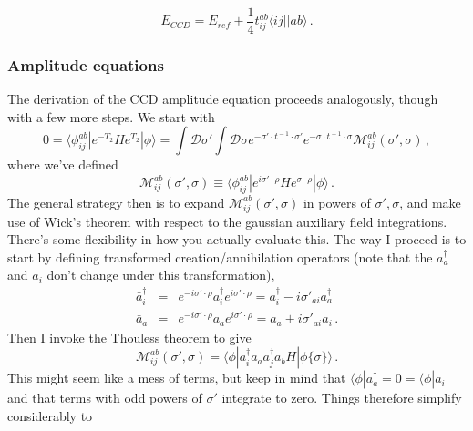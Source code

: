 \documentclass[12pt]{article}
\begin{document}
\begin{equation}
E_{CCD} = E_{ref} + \frac{1}{4}t^{ab}_{ij}\langle ij||ab\rangle\,.
\end{equation}

\subsubsection{Amplitude equations}
The derivation of the CCD amplitude equation proceeds analogously, though with a few more steps. We start with
\begin{equation}
0 = \langle\phi^{ab}_{ij}|e^{-T_2}He^{T_2}|\phi\rangle = \int \mathcal{D}\sigma'\int\mathcal{D}\sigma e^{-\sigma'\cdot t^{\!-1}\!\cdot\sigma'} e^{-\sigma\cdot t^{\!-1}\!\cdot\sigma} \mathcal{M}^{ab}_{ij}(\sigma',\sigma)\,,
\end{equation}
where we've defined 
\begin{equation}
 \mathcal{M}^{ab}_{ij}(\sigma',\sigma)\equiv\langle\phi^{ab}_{ij}|e^{i\sigma'\cdot\rho}He^{\sigma\cdot\rho}|\phi\rangle\,.
\end{equation}
The general strategy then is to expand $\mathcal{M}^{ab}_{ij}(\sigma',\sigma)$ in powers of $\sigma',\sigma$, and make use of Wick's theorem with respect to the gaussian auxiliary field integrations. There's some flexibility in how you actually evaluate this. The way I proceed is to start by defining transformed creation/annihilation operators (note that the $a^{\dagger}_a$ and $a_i$ don't change under this transformation),
\begin{eqnarray}
\bar{a}^{\dagger}_i &=& e^{-i\sigma'\cdot\rho}a^{\dagger}_i e^{i\sigma'\cdot\rho} = a^{\dagger}_i - i \sigma'_{ai}a^{\dagger}_a \\
\bar{a}_a &=&  e^{-i\sigma'\cdot\rho}a_a e^{i\sigma'\cdot\rho}  = a_a + i\sigma'_{ai}a_i\,.
\end{eqnarray}
Then I invoke the Thouless theorem to give 
\begin{equation}
\mathcal{M}^{ab}_{ij}(\sigma',\sigma) = \langle\phi|\bar{a}^{\dagger}_i\bar{a}_a\bar{a}^{\dagger}_j\bar{a}_b H|\phi\{\sigma\}\rangle\,.
\end{equation}
This might seem like a mess of terms, but keep in mind that $\langle\phi|a^{\dagger}_a = 0 = \langle\phi|a_i $ and that terms with odd powers of $\sigma'$ integrate to zero. Things therefore simplify considerably to 
\end{document}
